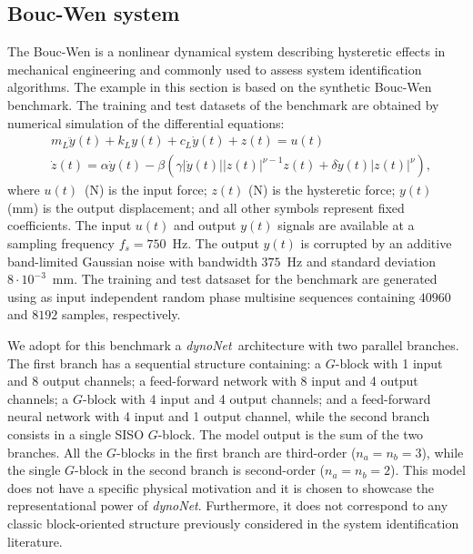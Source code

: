 \documentclass{article}
\newcommand{\Name}{\emph{dynoNet}}
\begin{document}
\subsection{Bouc-Wen system}
The Bouc-Wen is a nonlinear dynamical system describing hysteretic effects in mechanical engineering and commonly used to assess system identification algorithms. 
The example in this section is based on the synthetic Bouc-Wen benchmark\cite{noel2016hysteretic}. 
The training and test datasets of the benchmark are obtained by numerical simulation of the  differential equations:%
\begin{align*}
&m_L \ddot y(t) + k_Ly(t)  + c_L \dot y(t) + z(t) = u(t)\\
&\dot z(t) = \alpha \dot y(t) - \beta\left(\gamma|\dot y(t)||z(t)|^{\nu - 1}z(t) + \delta \dot y(t)|z(t)|^\nu\right), 
\end{align*}
where $u(t)$~(N) is the input force; $z(t)$ (N) is the hysteretic force; $y(t)$ (mm) is the output displacement; and all other symbols represent fixed coefficients. The input $u(t)$ and output $y(t)$ signals are available at a sampling frequency $f_s=750$~Hz. The output $y(t)$ is corrupted by an additive band-limited Gaussian noise with bandwidth $375$~Hz and standard deviation $8 \cdot 10^{-3}$~mm. The training and test datsaset for the benchmark are generated using as input independent random phase multisine sequences containing $40960$ and $8192$ samples, respectively.

We adopt for this benchmark a \Name\ architecture with two parallel branches. The first branch has a sequential structure containing: a $G$-block with 1 input and 8 output channels; a feed-forward network with 8 input and 4 output channels; a $G$-block with 4 input and 4 output channels; and a feed-forward neural network with 4 input and 1 output channel, while the second branch consists in a single SISO $G$-block. The model output is the sum of  the two branches.
All the $G$-blocks in the first branch are third-order ($n_a\!=\!n_b\!=\!3$), while the single $G$-block in the second branch is second-order ($n_a\! =\! n_b\! =\! 2$). This model does not have a specific physical motivation and it is chosen to showcase the representational power of {\Name}. Furthermore, it does not correspond to any classic block-oriented structure previously considered in the system identification literature. 
\end{document}
